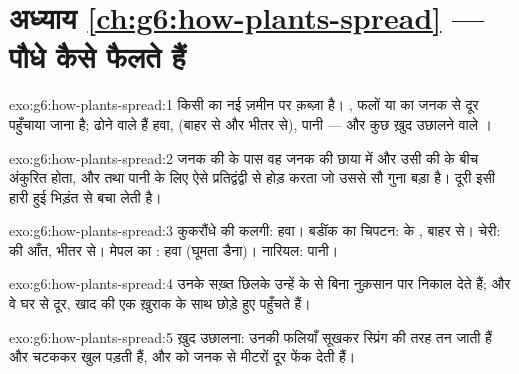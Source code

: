\section*{अध्याय \ref{ch:g6:how-plants-spread} --- पौधे कैसे फैलते हैं}

\begin{solution}{exo:g6:how-plants-spread:1}
 किसी  का नई ज़मीन पर क़ब्ज़ा है।  , फलों
या  का जनक से दूर पहुँचाया जाना है; ढोने वाले हैं हवा, 
(बाहर से और भीतर से), पानी --- और कुछ ख़ुद उछालने वाले ।
\end{solution}

\begin{solution}{exo:g6:how-plants-spread:2}
जनक की  के पास वह जनक की छाया में और उसी की  के बीच अंकुरित होता,
और  तथा पानी के लिए ऐसे प्रतिद्वंद्वी से होड़ करता जो उससे सौ गुना
बड़ा है। दूरी इसी हारी हुई भिड़ंत से बचा लेती है।
\end{solution}

\begin{solution}{exo:g6:how-plants-spread:3}
कुकरौंधे की कलगी: हवा। बर्डॉक का चिपटन:  के , बाहर से। चेरी:
 की आँत, भीतर से। मेपल का : हवा (घूमता डैना)। नारियल: पानी।
\end{solution}

\begin{solution}{exo:g6:how-plants-spread:4}
उनके सख़्त छिलके उन्हें  के  से बिना नुक़सान पार निकाल देते
हैं; और वे घर से दूर, खाद की एक ख़ुराक के साथ छोड़े हुए पहुँचते हैं।
\end{solution}

\begin{solution}{exo:g6:how-plants-spread:5}
ख़ुद उछालना: उनकी फलियाँ सूखकर स्प्रिंग की तरह तन जाती हैं और चटककर खुल
पड़ती हैं, और  को जनक से मीटरों दूर फेंक देती हैं।
\end{solution}

